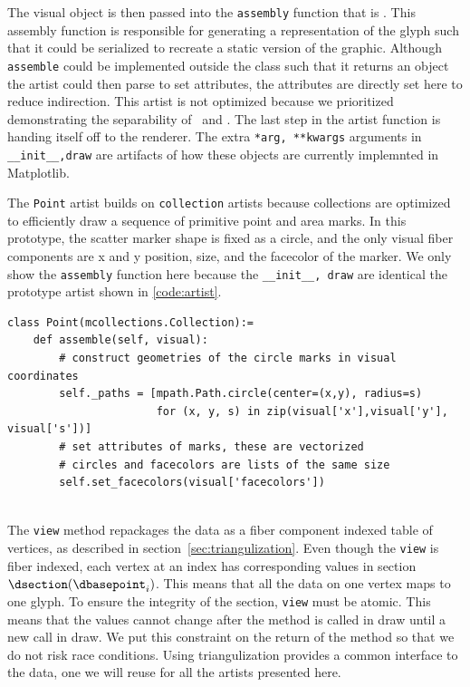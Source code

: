 \documentclass[../main.tex]{subfiles}
\begin{document}
The visual object is then passed into the \texttt{assembly} function that is \vmarkd. This assembly function is responsible for generating a representation of the glyph such that it could be serialized to recreate a static version of the graphic. Although \texttt{assemble} could be implemented outside the class such that it returns an object the artist could then parse to set attributes, the attributes are directly set here to reduce indirection. This artist is not optimized because we prioritized demonstrating the separability of \vchannel\ and \vmarkd. The last step in the artist function is handing itself off to the renderer. The extra \texttt{*arg, **kwargs} arguments in \texttt{__init__,draw} are artifacts of how these objects are currently implemnted in Matplotlib. 

The \texttt{Point} artist builds on \texttt{collection} artists because collections are optimized to efficiently draw a sequence of primitive point and area marks. In this prototype, the scatter marker shape is fixed as a circle, and the only visual fiber components are x and y position, size, and the facecolor of the marker. We only show the \texttt{assembly} function here because the \texttt{__init__, draw} are identical the prototype artist shown in \ref{code:artist}. 
\begin{verbatim}
class Point(mcollections.Collection):=
    def assemble(self, visual):
        # construct geometries of the circle marks in visual coordinates
        self._paths = [mpath.Path.circle(center=(x,y), radius=s) 
                       for (x, y, s) in zip(visual['x'],visual['y'], visual['s'])] 
        # set attributes of marks, these are vectorized 
        # circles and facecolors are lists of the same size
        self.set_facecolors(visual['facecolors'])
        
\end{verbatim} 
The \texttt{view} method repackages the data as a fiber component indexed table of vertices, as described in section~\ref{sec:triangulization}. Even though the \texttt{view} is fiber indexed, each vertex at an index \dbasepoint has corresponding values in section $\dsection(\dbasepoint_{i})$. This means that all the data on one vertex maps to one glyph. To ensure the integrity of the section, \texttt{view} must be atomic. This means that the values cannot change after the method is called in draw until a new call in draw. We put this constraint on the return of the  method so that we do not risk race conditions. Using triangulization provides a common interface to the data, one we will reuse for all the artists presented here. 
\end{document}
